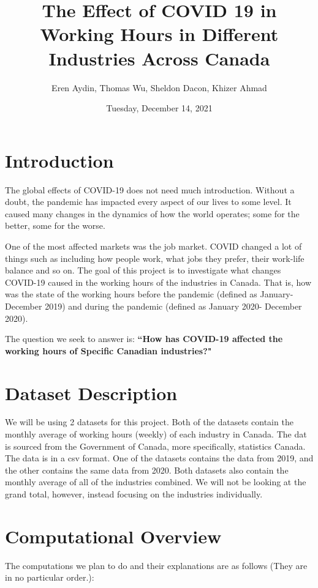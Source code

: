 \documentclass[fontsize=11pt]{article}
\title{  
The Effect of COVID 19 in Working Hours in Different Industries Across Canada}
\author{Eren Aydin, Thomas Wu, Sheldon Dacon, Khizer Ahmad}
\date{Tuesday, December 14, 2021}
\begin{document}
  
\maketitle  
  
\section*{Introduction}  
The global effects of COVID-19 does not need much introduction. Without a doubt, the pandemic has impacted every aspect of our lives to some level. It caused many changes in the dynamics of how the world operates; some for the better, some for the worse.   
  
One of the most affected markets was the job market. COVID changed a lot of things such as including how people work, what jobs they prefer, their work-life balance and so on. The goal of this project is to investigate what changes COVID-19 caused in the working hours of the industries in Canada. That is, how was the state of the working hours before the pandemic (defined as January-December 2019) and during the pandemic (defined as January 2020- December 2020).  
  
The question we seek to answer is:   
\textbf{``How has COVID-19 affected the working hours of Specific Canadian industries?"}  
  
  
\section*{Dataset Description}  
We will be using 2 datasets for this project. Both of the datasets contain the monthly average of working hours (weekly) of each industry in Canada. The dat is sourced from the Government of Canada, more specifically, statistics Canada. The data is in a csv format. One of the datasets contains the data from 2019, and the other contains the same data from 2020. Both datasets also contain the monthly average of all of the industries combined. We will not be looking at the grand total, however, instead focusing on the industries individually.   
 
 
  
\section*{Computational Overview}  
The computations we plan to do and their explanations are as follows (They are in no particular order.):  
  
\end{document}
